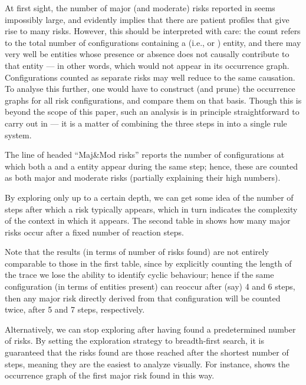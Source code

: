 At first sight, the number of major (and moderate) risks reported in  seems impossibly large, and evidently implies that there are patient profiles that give rise to many risks. However, this should be interpreted with care: the count refers to the total number of configurations containing a \Forbidden (i.e., \major or \minor) entity, and there may very well be entities whose presence or absence does not causally contribute to that \Forbidden entity --- in other words, which would not appear in its occurrence graph. Configurations counted as separate risks may well reduce to the same causation. To analyse this further, one would have to construct (and prune) the occurrence graphs for all risk configurations, and compare them on that basis. Though this is beyond the scope of this paper, such an analysis is in principle straightforward to carry out in \GROOVE --- it is a matter of combining the three steps in  into a single rule system.

The line of  headed ``Maj\&Mod risks'' reports the number of configurations at which both a \major and a \moderate entity appear during the same step; hence, these are counted as both major and moderate risks (partially explaining their high numbers).
 
\medskip\noindent By exploring only up to a certain depth, we can get some idea of the number of steps after which a risk typically appears, which in turn indicates the complexity of the context in which it appears. The second table in  shows how many major risks occur after a fixed number of reaction steps.

Note that the results (in terms of number of risks found) are not entirely comparable to those in the first table, since by explicitly counting the length of the trace we lose the ability to identify cyclic behaviour; hence if the same configuration (in terms of entities present) can reoccur after (say) 4 and 6 steps, then any major risk directly derived from that configuration will be counted twice, after 5 and 7 steps, respectively.

\medskip\noindent Alternatively, we can stop exploring after having found a predetermined number of risks. By setting the exploration strategy to breadth-first search, it is guaranteed that the risks found are those reached after the shortest number of steps, meaning they are the easiest to analyze visually. For instance,  shows the occurrence graph of the first major risk found in this way.

